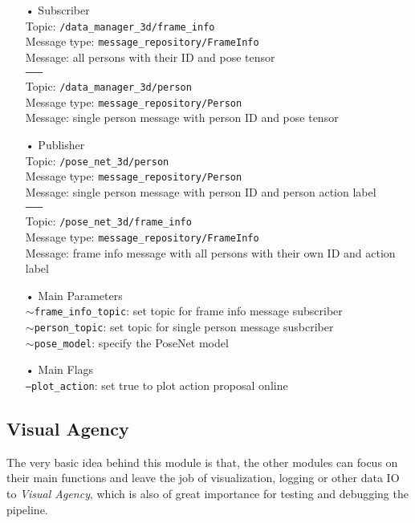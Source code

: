 \begin{itemize}
\item[•] Subscriber \\
Topic: \texttt{/data\_manager\_3d/frame\_info} \\
Message type: \texttt{message\_repository/FrameInfo} \\
Message: all persons with their ID and pose tensor \\
\texttt{--------} \\
Topic: \texttt{/data\_manager\_3d/person} \\
Message type: \texttt{message\_repository/Person} \\
Message: single person message with person ID and pose tensor

\item[•] Publisher \\
Topic: \texttt{/pose\_net\_3d/person} \\
Message type: \texttt{message\_repository/Person} \\
Message: single person message with person ID and person action label \\
\texttt{--------} \\
Topic:  \texttt{/pose\_net\_3d/frame\_info} \\
Message type: \texttt{message\_repository/FrameInfo} \\
Message: frame info message with all persons with their own ID and action label 

\item[•] Main Parameters \\
\texttt{$\sim$frame\_info\_topic}: set topic for frame info message subscriber \\
\texttt{$\sim$person\_topic}: set topic for single person message susbcriber \\
\texttt{$\sim$pose\_model}: specify the PoseNet model

\item[•] Main Flags \\
\texttt{---plot\_action}: set true to plot action proposal online
\end{itemize}

\subsection{Visual Agency}
\label{pipeline:VA}
The very basic idea behind this module is that, the other modules can focus on their main functions and leave the job of visualization, logging or other data IO to \textit{Visual Agency}, which is also of great importance for testing and debugging the pipeline. 

